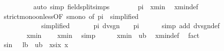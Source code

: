 \begin{isabellebody}
\ \ \ \ \ \ \ \ \isamarkupfalse%
\ {\isacharparenleft}{\kern0pt}auto\ simp{\isacharcolon}{\kern0pt}\ field{\isacharunderscore}{\kern0pt}split{\isacharunderscore}{\kern0pt}simps{\isacharparenright}{\kern0pt}\isanewline
\ \ \ \ \ \ \isamarkupfalse%
\ {\isachardoublequoteopen}pi\ {\isasymle}\ {}{\isacharslash}{\kern0pt}xmin{\isachardoublequoteclose}\ \isamarkupfalse%
\ xmin{\isacharunderscore}{\kern0pt}def\isanewline
\ \ \ \ \ \ \ \ \isamarkupfalse%
\ strict{\isacharunderscore}{\kern0pt}mono{\isacharunderscore}{\kern0pt}on{\isacharunderscore}{\kern0pt}less{\isacharbrackleft}{\kern0pt}OF\ smono{\isacharcomma}{\kern0pt}\ of\ pi\ {\isasymxi}{\isacharcomma}{\kern0pt}\ simplified{\isacharcomma}{\kern0pt}\isanewline
\ \ \ \ \ \ \ \ \ \ \ \ simplified\ {\isacartoucheopen}{\isasymxi}\ {\isacharasterisk}{\kern0pt}\ {}\ {\isacharless}{\kern0pt}\ {}\ {\isacharasterisk}{\kern0pt}\ pi{\isacartoucheclose}\ {\isacartoucheopen}dvsgn\ {\isasymxi}\ {\isacharequal}{\kern0pt}\ {}{\isacartoucheclose}{\isacharbrackright}{\kern0pt}\ {\isacartoucheopen}pi\ {\isacharless}{\kern0pt}\ {\isasymxi}\ {\isacharasterisk}{\kern0pt}\ {}{\isacartoucheclose}\ \isamarkupfalse%
\ {\isacharparenleft}{\kern0pt}simp\ add{\isacharcolon}{\kern0pt}\ dvsgn{\isacharunderscore}{\kern0pt}def{\isacharparenright}{\kern0pt}\isanewline
\ \ \ \ \isamarkupfalse%
\isanewline
\ \ \ \ \isamarkupfalse%
\ {\isachardoublequoteopen}{}\ {\isasymle}\ xmin{\isachardoublequoteclose}\ \isamarkupfalse%
\ {\isacartoucheopen}{}\ {\isacharless}{\kern0pt}\ xmin{\isacartoucheclose}\ \isamarkupfalse%
\ simp\isanewline
\ \ \ \ \isamarkupfalse%
\ {\isachardoublequoteopen}xmin\ {\isasymle}\ ub{\isachardoublequoteclose}\ \isamarkupfalse%
\ xmin{\isacharunderscore}{\kern0pt}def\ \isamarkupfalse%
\ fact\isanewline
\ \ \isamarkupfalse%
\isanewline
\ \ \isamarkupfalse%
\ \isamarkupfalse%
\ {\isachardoublequoteopen}sin\ {\isacharparenleft}{\kern0pt}{}\ {\isacharslash}{\kern0pt}\ lb{\isacharparenright}{\kern0pt}\ {\isacharasterisk}{\kern0pt}\ ub\ {\isasymle}\ xsix\ x{\isachardoublequoteclose}\ \isakeywordONE{{\isachardot}{\kern0pt}}\isamarkupfalse%
\isanewline
{}\isamarkupfalse%
%
\endisatagproof
{\isafoldproof}%
%
\isadelimproof

\end{isabellebody}
